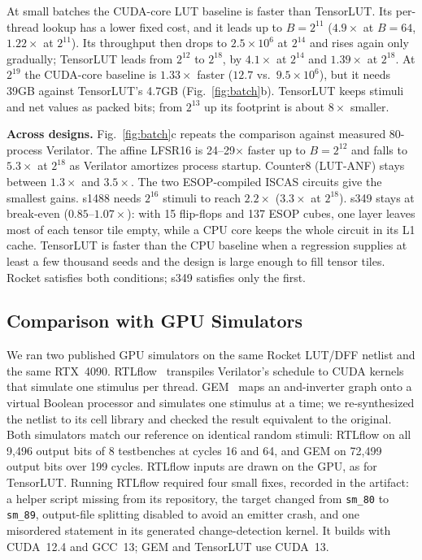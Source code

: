 \documentclass[sigconf]{acmart}
\begin{document}
At small batches the CUDA-core LUT baseline is faster than TensorLUT. Its per-thread lookup has a
lower fixed cost, and it leads up to $B=2^{11}$ ($4.9\times$ at $B=64$, $1.22\times$ at $2^{11}$).
Its throughput then drops to $2.5\times10^6$ at $2^{14}$ and rises again only gradually; TensorLUT
leads from $2^{12}$ to $2^{18}$, by $4.1\times$ at $2^{14}$ and $1.39\times$ at $2^{18}$. At
$2^{19}$ the CUDA-core baseline is $1.33\times$ faster ($12.7$ vs.\ $9.5\times10^6$), but it needs
39GB against TensorLUT's 4.7GB (Fig.~\ref{fig:batch}b). TensorLUT keeps stimuli and net values as
packed bits; from $2^{13}$ up its footprint is about $8\times$ smaller.

\textbf{Across designs.} Fig.~\ref{fig:batch}c repeats the comparison against measured 80-process
Verilator. The affine LFSR16 is 24--29$\times$ faster up to $B=2^{12}$ and falls to $5.3\times$ at
$2^{18}$ as Verilator amortizes process startup. Counter8 (LUT-ANF) stays between $1.3\times$ and
$3.5\times$. The two ESOP-compiled ISCAS circuits give the smallest gains. s1488 needs $2^{16}$ stimuli to
reach $2.2\times$ ($3.3\times$ at $2^{18}$). s349 stays at break-even ($0.85$--$1.07\times$): with 15
flip-flops and 137 ESOP cubes, one layer leaves most of each tensor tile empty, while a CPU core keeps
the whole circuit in its L1 cache. TensorLUT is faster than the CPU baseline when a regression
supplies at least a few thousand seeds and the design is large enough to fill tensor tiles. Rocket
satisfies both conditions; s349 satisfies only the first.

\subsection{Comparison with GPU Simulators}\label{sec:gpusim}
We ran two published GPU simulators on the same Rocket LUT/DFF netlist and the same RTX~4090.
RTLflow~\cite{rtlflow} transpiles Verilator's schedule to CUDA kernels that simulate one stimulus per
thread. GEM~\cite{gem} maps an and-inverter graph onto a virtual Boolean processor and simulates one
stimulus at a time; we re-synthesized the netlist to its cell library and checked the result
equivalent to the original. Both simulators match our reference on identical random stimuli: RTLflow
on all 9,496 output bits of 8 testbenches at cycles 16 and 64, and GEM on 72,499 output bits over 199
cycles. RTLflow inputs are drawn on the GPU, as for TensorLUT. Running RTLflow required four small
fixes, recorded in the artifact: a helper script missing from its repository, the target changed
from \texttt{sm\_80} to \texttt{sm\_89}, output-file splitting disabled to avoid an emitter crash, and
one misordered statement in its generated change-detection kernel. It builds with CUDA~12.4 and GCC~13;
GEM and TensorLUT use CUDA~13.
\end{document}
